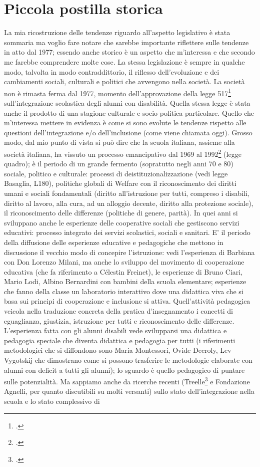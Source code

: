 \section*{Piccola postilla storica}

La mia ricostruzione delle tendenze riguardo all'aspetto legislativo è stata sommaria ma voglio fare notare che sarebbe importante riflettere sulle tendenze in atto dal 1977; essendo anche storico è un aspetto che m'interessa e che secondo me farebbe comprendere molte cose. La stessa legislazione è sempre in qualche modo, talvolta in modo contraddittorio, il riflesso dell'evoluzione e dei cambiamenti sociali, culturali e politici che avvengono nella società. La società non è rimasta ferma dal 1977, momento dell'approvazione della legge 517\footcite{Legge_517_77} sull'integrazione scolastica degli alunni con disabilità. Quella stessa legge è stata anche il prodotto di una stagione culturale e socio-politica particolare. Quello che m'interessa mettere in evidenza è come si sono evolute le tendenze rispetto alle questioni dell'integrazione e/o dell'inclusione (come viene chiamata oggi). Grosso modo, dal mio punto di vista si può dire che la scuola italiana, assieme alla società italiana, ha vissuto un processo emancipativo dal 1969 al 1992\footcite{Legge_104_92} (legge quadro); è il periodo di un grande fermento (sopratutto negli anni 70 e 80) sociale, politico e culturale: processi di deistituzionalizzazione (vedi legge Basaglia, L180), politiche globali di Welfare con il riconoscimento dei diritti umani e sociali fondamentali (diritto all'istruzione per tutti, compreso i disabili, diritto al lavoro, alla cura, ad un alloggio decente, diritto alla protezione sociale), il riconoscimento delle differenze (politiche di genere, parità). In quei anni si sviluppano anche le esperienze delle cooperative sociali che gestiscono servizi educativi: processo integrato dei servizi scolastici, sociali e sanitari. E' il periodo della diffusione delle esperienze educative e pedagogiche che mettono in discussione il vecchio modo di concepire l'istruzione: vedi l'esperienza di Barbiana con Don Lorenzo Milani, ma anche lo sviluppo del movimento di cooperazione educativa (che fa riferimento a Célestin Freinet), le esperienze di Bruno Ciari, Mario Lodi, Albino Bernardini con bambini della scuola elementare; esperienze che fanno della classe un laboratorio interattivo dove una didattica viva che si basa sui principi di cooperazione e inclusione si attiva. Quell'attività pedagogica veicola nella traduzione concreta della pratica d'insegnamento i concetti di eguaglianza, giustizia, istruzione per tutti e riconoscimento delle differenze. L'esperienza fatta con gli alunni disabili vede svilupparsi una didattica e pedagogia speciale che diventa didattica e pedagogia per tutti (i riferimenti metodologici che si diffondono sono Maria Montessori, Ovide Decroly, Lev Vygotskij che dimostrano come si possono trasferire le metodologie elaborate con alunni con deficit a tutti gli alunni); lo sguardo è quello pedagogico di puntare sulle potenzialità. Ma sappiamo anche da ricerche recenti (Treelle\footcite{treelle} e Fondazione Agnelli, per quanto discutibili su molti versanti) sullo stato dell'integrazione nella scuola e lo stato complessivo di 